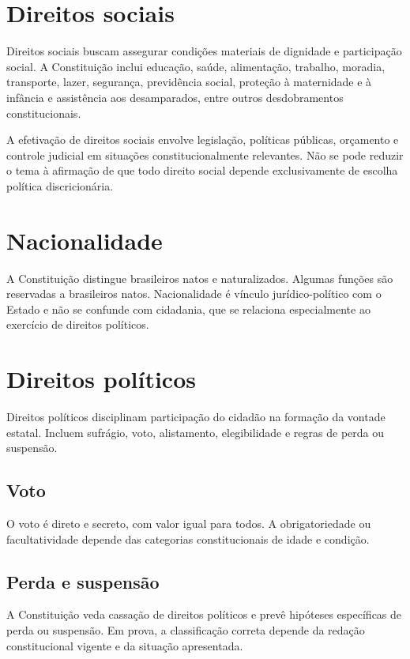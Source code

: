\section{Direitos sociais}

Direitos sociais buscam assegurar condições materiais de dignidade e participação social. A Constituição inclui educação, saúde, alimentação, trabalho, moradia, transporte, lazer, segurança, previdência social, proteção à maternidade e à infância e assistência aos desamparados, entre outros desdobramentos constitucionais.

A efetivação de direitos sociais envolve legislação, políticas públicas, orçamento e controle judicial em situações constitucionalmente relevantes. Não se pode reduzir o tema à afirmação de que todo direito social depende exclusivamente de escolha política discricionária.

\section{Nacionalidade}

A Constituição distingue brasileiros natos e naturalizados. Algumas funções são reservadas a brasileiros natos. Nacionalidade é vínculo jurídico-político com o Estado e não se confunde com cidadania, que se relaciona especialmente ao exercício de direitos políticos.

\section{Direitos políticos}

Direitos políticos disciplinam participação do cidadão na formação da vontade estatal. Incluem sufrágio, voto, alistamento, elegibilidade e regras de perda ou suspensão.

\subsection{Voto}

O voto é direto e secreto, com valor igual para todos. A obrigatoriedade ou facultatividade depende das categorias constitucionais de idade e condição.

\subsection{Perda e suspensão}

A Constituição veda cassação de direitos políticos e prevê hipóteses específicas de perda ou suspensão. Em prova, a classificação correta depende da redação constitucional vigente e da situação apresentada.

